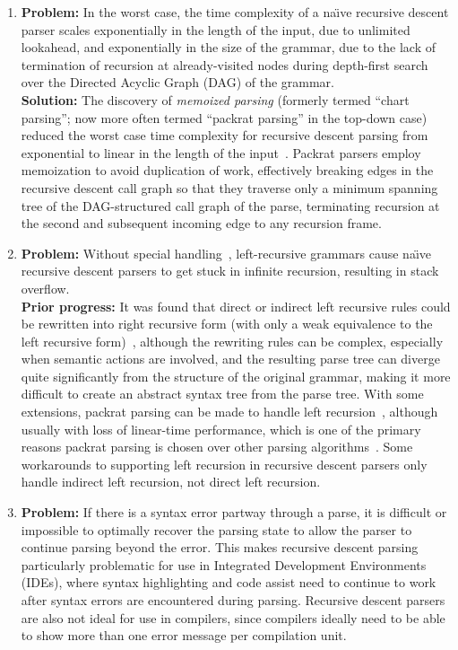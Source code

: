 \documentclass[manuscript,screen]{acmart}
\begin{document}
\begin{enumerate}
    \item {\bf Problem:} In the worst case, the time complexity of a na\"{\i}ve recursive descent parser scales exponentially in the length of the input, due to unlimited lookahead, and exponentially in the size of the grammar, due to the lack of termination of recursion at already-visited nodes during depth-first search over the Directed Acyclic Graph (DAG) of the grammar.\\
    {\bf Solution:} The discovery of \emph{memoized parsing} (formerly termed ``chart parsing''; now more often termed ``packrat parsing'' in the top-down case) reduced the worst case time complexity for recursive descent parsing from exponential to linear in the length of the input~\citep{norvig1991}. Packrat parsers employ memoization to avoid duplication of work, effectively breaking edges in the recursive descent call graph so that they traverse only a minimum spanning tree of the DAG-structured call graph of the parse, terminating recursion at the second and subsequent incoming edge to any recursion frame.
    \item {\bf Problem:} Without special handling~\citep{medeiros2014}, left-recursive grammars cause na\"{\i}ve recursive descent parsers to get stuck in infinite recursion, resulting in stack overflow.\\
    {\bf Prior progress:} It was found that direct or indirect left recursive rules could be rewritten into right recursive form (with only a weak equivalence to the left recursive form)~\citep{ford2002}, although the rewriting rules can be complex, especially when semantic actions are involved, and the resulting parse tree can diverge quite significantly from the structure of the original grammar, making it more difficult to create an abstract syntax tree from the parse tree. With some extensions, packrat parsing can be made to handle left recursion~\citep{ford2002,frost2006,frost2007,warth2008}, although usually with loss of linear-time performance, which is one of the primary reasons packrat parsing is chosen over other parsing algorithms~\citep{warth2008}. Some workarounds to supporting left recursion in recursive descent parsers only handle indirect left recursion, not direct left recursion.
    \item {\bf Problem:} If there is a syntax error partway through a parse, it is difficult or impossible to optimally recover the parsing state to allow the parser to continue parsing beyond the error. This makes recursive descent parsing particularly problematic for use in Integrated Development Environments (IDEs), where syntax highlighting and code assist need to continue to work after syntax errors are encountered during parsing. Recursive descent parsers are also not ideal for use in compilers, since compilers ideally need to be able to show more than one error message per compilation unit.\\

\end{enumerate}
\end{document}
